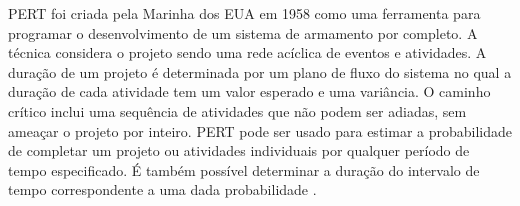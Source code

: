 PERT foi criada pela Marinha dos EUA em 1958 como uma ferramenta para programar o desenvolvimento de um sistema de armamento por completo. A técnica considera o projeto sendo uma rede acíclica de eventos e atividades. A duração de um projeto é determinada por um plano de fluxo do sistema no qual a duração de cada atividade tem um valor esperado e uma variância. O caminho crítico inclui uma sequência de atividades que não podem ser adiadas, sem ameaçar o projeto por inteiro. PERT pode ser usado para estimar a probabilidade de completar um projeto ou atividades individuais por qualquer período de tempo especificado. É também possível determinar a duração do intervalo de tempo correspondente a uma dada probabilidade \cite{cottrell1999simplified}.

